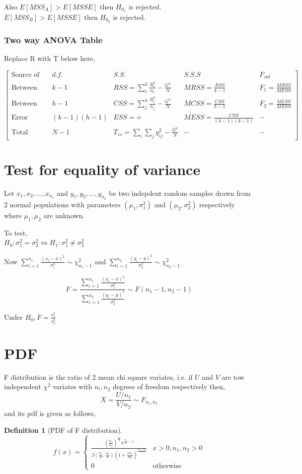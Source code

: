 \documentclass[oneside,11pt,pdftex]{book}%
\numberwithin{equation}{section}
\newtheorem{definition}[theorem]{Definition}
\numberwithin{section}{chapter}
\numberwithin{equation}{chapter}
\begin{document}
Also $ E[MSS_A]>E[MSSE] $ then $ H_{0_1} $ is rejected.\\
$ E[MSS_B]>E[MSSE] $ then $ H_{0_2} $ is rejected.

\subsubsection{Two way ANOVA Table}
Replace R with T below here,

\[ \begin{bmatrix}
	\text{Source of variance} & d.f. & S.S. & S.S.S & F_{cal}\\
	\text{Between factor A} & k-1 & RSS=\sum_i^k \frac{R_i^2}{n_i}-\frac{G^2}{N} & MRSS=\frac{RSS}{k-1} & F_1=\frac{MRSS}{MESS}\\
	\text{Between factor B} & h-1 & CSS=\sum_j^h \frac{R_j^2}{n_j}-\frac{G^2}{N} & MCSS=\frac{CSS}{h-1} & F_2=\frac{MLSS}{MESS}\\
	\text{Error} & (k-1)(h-1) & ESS=+ & MESS=\frac{CSS}{(h-1)(k-1)} & -\\
	\text{Total} & N-1 & T_{ss}=\sum_i \sum_j y_{ij}^2-\frac{G^2}{N} & - & -
\end{bmatrix} \]

\section{Test for equality of variance}
Let $ x_1,x_2,\dots, x_{n_1} $ and $ y_1,y_2,\dots, y_{n_2} $ be two indepdent random samples drawn from $ 2 $ normal populations with parameters $ (\mu_1, \sigma_1^2) $ and $ (\mu_2,\sigma_2^2) $ respectively where $ \mu_1,\mu_2  $ are unknown.

To test,\\
$ H_0: \sigma_1^2=\sigma_2^2$ vs $ H_1: \sigma_1^2\neq \sigma_2^2 $

Now $ \sum_{i=1}^{n_1} \frac{(x_i-\overline{x})^2}{\sigma_1^2}\sim \chi^2_{n_1-1}$ and $ \sum_{i=1}^{n_2} \frac{(y_i-\overline{y})^2}{\sigma_2^2}\sim \chi^2_{n_2-1}$

$$ F=\frac{\sum_{i=1}^{n_1} \frac{(x_i-\overline{x})^2}{\sigma_1^2}}{\sum_{i=1}^{n_2} \frac{(y_i-\overline{y})^2}{\sigma_2^2}}\sim F(n_1-1,n_2-1) $$

Under $ H_0, F=\frac{s_1^2}{s_2^2}$ 
\section{PDF}
F distribution is the ratio of 2 mean chi square variates, i.e. if $ U $ and $ V $ are tow independent $ \chi^2 $ variates with $ n_!, n_2 $ degrees of freedom respectively then,
\[ X = \frac{U/n_1}{V/n_2}\sim F_{n_1,n_2} \]
and its pdf is given as follows,
\begin{definition}[PDF of F distribution]
	\[ f(x)=\begin{cases}
		\frac{\left(\frac{n_1}{n_2}\right)^{\frac{n_1}{2}}x^{\frac{n_1}{2}-1}}{\beta \left(\frac{n_1}{2},\frac{n_2}{2}\right)\left(1+\frac{xn_1}{n_2}\right)^{\frac{n_1+n_2}{2}}} & x>0, n_1,n_2>0\\
		0 & \text{otherwise}
	\end{cases} \]
\end{definition}
\end{document}
